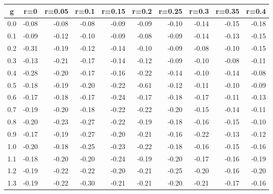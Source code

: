 %
\begin{table}[!tbp]
 \begin{center}
 \begin{tabular}{rrrrrrrrrr}\hline\hline
\multicolumn{1}{c}{g}&\multicolumn{1}{c}{r=0}&\multicolumn{1}{c}{r=0.05}&\multicolumn{1}{c}{r=0.1}&\multicolumn{1}{c}{r=0.15}&\multicolumn{1}{c}{r=0.2}&\multicolumn{1}{c}{r=0.25}&\multicolumn{1}{c}{r=0.3}&\multicolumn{1}{c}{r=0.35}&\multicolumn{1}{c}{r=0.4}\tabularnewline
\hline
0.0&-0.08&-0.08&-0.08&-0.09&-0.09&-0.10&-0.14&-0.15&-0.18\tabularnewline
0.1&-0.09&-0.12&-0.10&-0.09&-0.08&-0.09&-0.14&-0.13&-0.15\tabularnewline
0.2&-0.31&-0.19&-0.12&-0.14&-0.10&-0.09&-0.08&-0.10&-0.15\tabularnewline
0.3&-0.13&-0.21&-0.17&-0.14&-0.12&-0.09&-0.10&-0.08&-0.11\tabularnewline
0.4&-0.28&-0.20&-0.17&-0.16&-0.22&-0.14&-0.10&-0.14&-0.08\tabularnewline
0.5&-0.18&-0.19&-0.20&-0.22&-0.61&-0.12&-0.11&-0.10&-0.09\tabularnewline
0.6&-0.17&-0.18&-0.17&-0.24&-0.17&-0.18&-0.17&-0.11&-0.13\tabularnewline
0.7&-0.19&-0.20&-0.18&-0.22&-0.22&-0.20&-0.15&-0.14&-0.11\tabularnewline
0.8&-0.20&-0.23&-0.27&-0.22&-0.19&-0.18&-0.16&-0.15&-0.10\tabularnewline
0.9&-0.17&-0.19&-0.27&-0.20&-0.21&-0.16&-0.22&-0.13&-0.12\tabularnewline
1.0&-0.20&-0.18&-0.25&-0.23&-0.22&-0.18&-0.16&-0.15&-0.16\tabularnewline
1.1&-0.18&-0.20&-0.20&-0.24&-0.19&-0.20&-0.17&-0.16&-0.19\tabularnewline
1.2&-0.19&-0.22&-0.22&-0.20&-0.21&-0.25&-0.20&-0.16&-0.20\tabularnewline
1.3&-0.19&-0.22&-0.30&-0.21&-0.21&-0.20&-0.21&-0.17&-0.16\tabularnewline
\hline
\end{tabular}

\end{center}

\end{table}

